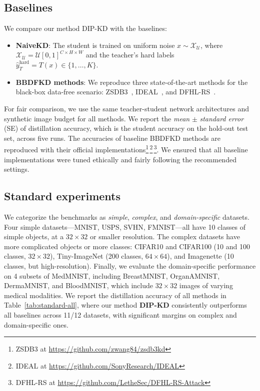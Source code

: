 \subsection{Baselines} \label{sec:04-experiments-baselines}
\begin{foldable} %
  We compare our method DIP-KD with the baselines:
  \begin{itemize}
    \item \textbf{NaiveKD}: The student is trained on uniform noise $x \sim \mathcal{X}_\mathcal{U}$, where $\mathcal{X}_\mathcal{U}=\mathcal{U}[0,1]^{C \times H \times W}$ and the teacher's hard labels $\hat{y}_{T}^\text{hard} = T(x) \in \{1, \ldots, K\}$.
    \item \textbf{BBDFKD methods}: We reproduce three state-of-the-art methods for the black-box data-free scenario: ZSDB3~\cite{wang2021zero}, IDEAL~\cite{zhang2022ideal}, and DFHL-RS~\cite{yuan2024data}.
  \end{itemize}
  For fair comparison, we use the same teacher-student network architectures and synthetic image budget for all methods.
  We report the \textit{mean} $\pm$ \textit{standard error} (SE) of distillation accuracy, which is the student accuracy on the hold-out test set, across five runs.
  The accuracies of baseline BBDFKD methods are reproduced with their official implementations\footnote{ZSDB3 at \url{https://github.com/zwang84/zsdb3kd}}\,\footnote{IDEAL at \url{https://github.com/SonyResearch/IDEAL}}\,\footnote{DFHL-RS at \url{https://github.com/LetheSec/DFHL-RS-Attack}}.
  We ensured that all baseline implementations were tuned ethically and fairly following the recommended settings.
\end{foldable}

\subsection{Standard experiments} \label{sec:04-experiments-standard}
\begin{foldable} %
  We categorize the benchmarks as \textit{simple}, \textit{complex}, and \textit{domain-specific} datasets.
  Four simple datasets---MNIST, USPS, SVHN, FMNIST---all have 10 classes of simple objects, at a $32\times32$ or smaller resolution.
  The complex datasets have more complicated objects or more classes: CIFAR10 and CIFAR100 (10 and 100 classes, $32\times32$), Tiny-ImageNet (200 classes, $64\times64$), and Imagenette (10 classes, but high-resolution).
  Finally, we evaluate the domain-specific performance on 4 subsets of MedMNIST, including BreastMNIST, OrganAMNIST, DermaMNIST, and BloodMNIST, which include $32\times32$ images of varying medical modalities.
  We report the distillation accuracy of all methods in Table~\ref{tab:standard-all}, where our method \textbf{DIP-KD} consistently outperforms all baselines across 11/12 datasets, with significant margins on complex and domain-specific ones.
\end{foldable}

